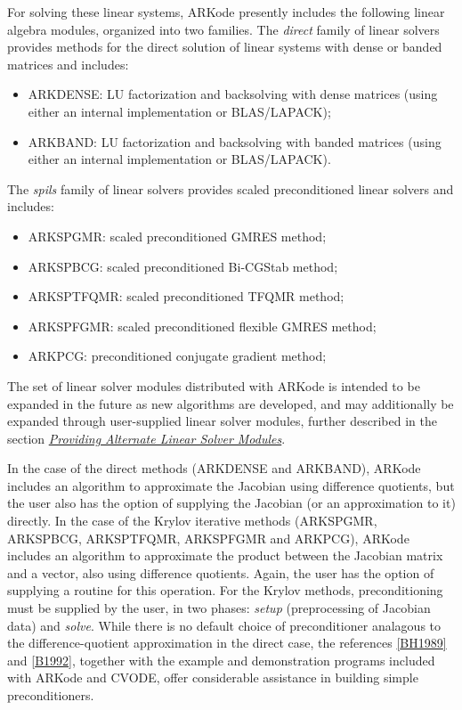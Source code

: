 \documentclass[letterpaper,10pt,english]{sphinxmanual}
\begin{document}
For solving these linear systems, ARKode presently includes the
following linear algebra modules, organized into two families.  The
\emph{direct} family of linear solvers provides methods for the direct
solution of linear systems with dense or banded matrices and includes:
\begin{itemize}
\item {} 
ARKDENSE: LU factorization and backsolving with dense matrices
(using either an internal implementation or BLAS/LAPACK);

\item {} 
ARKBAND: LU factorization and backsolving with banded matrices
(using either an internal implementation or BLAS/LAPACK).

\end{itemize}

The \emph{spils} family of linear solvers provides scaled preconditioned
linear solvers and includes:
\begin{itemize}
\item {} 
ARKSPGMR: scaled preconditioned GMRES method;

\item {} 
ARKSPBCG: scaled preconditioned Bi-CGStab method;

\item {} 
ARKSPTFQMR: scaled preconditioned TFQMR method;

\item {} 
ARKSPFGMR: scaled preconditioned flexible GMRES method;

\item {} 
ARKPCG: preconditioned conjugate gradient method;

\end{itemize}

The set of linear solver modules distributed with ARKode is
intended to be expanded in the future as new algorithms are developed,
and may additionally be expanded through user-supplied linear solver
modules, further described in the section {\hyperref[linear_solvers/custom:linearsolvers-custom]{\emph{Providing Alternate Linear Solver Modules}}}.

In the case of the direct methods (ARKDENSE and ARKBAND), ARKode
includes an algorithm to approximate the Jacobian using difference
quotients, but the user also has the option of supplying the Jacobian
(or an approximation to it) directly.  In the case of the Krylov
iterative methods (ARKSPGMR, ARKSPBCG, ARKSPTFQMR, ARKSPFGMR and
ARKPCG), ARKode includes an algorithm to approximate the product
between the Jacobian matrix and a vector, also using difference
quotients.  Again, the user has the option of supplying a routine for
this operation.  For the Krylov methods, preconditioning must be
supplied by the user, in two phases: \emph{setup} (preprocessing of
Jacobian data) and \emph{solve}.  While there is no default choice of
preconditioner analagous to the difference-quotient approximation in
the direct case, the references {\hyperref[References:bh1989]{{[}BH1989{]}}} and {\hyperref[References:b1992]{{[}B1992{]}}}, together with
the example and demonstration programs included with ARKode and CVODE,
offer considerable assistance in building simple preconditioners.
\end{document}
